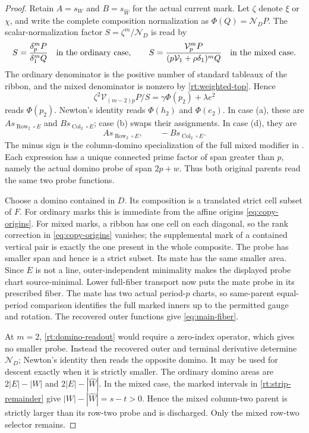 \documentclass[11pt,a4paper]{amsart}
\numberwithin{equation}{section}
\theoremstyle{plain}
\theoremstyle{definition}
\newcommand{\Row}{\operatorname{Row}}
\newcommand{\Col}{\operatorname{Col}}
\newcommand{\Vop}{\mathcal V}
\begin{document}
\begin{proof}
Retain \(A=s_W\) and \(B=s_{\widehat W}\) for the actual current mark.
Let \(\zeta\) denote \(\xi\) or \(\chi\), and write the complete composition
normalization as \(\Phi(Q)=\mathcal N_D P\).
The scalar-normalization factor \(S=\zeta^m/\mathcal N_D\) is read by
\[
 S=\frac{\delta_p^m P}{\delta_1^m Q}\quad\hbox{in the ordinary case},
 \qquad
 S=\frac{\Vop_p^m P}{(p\Vop_1+\rho\delta_1)^m Q}
       \quad\hbox{in the mixed case}.
\]
The ordinary denominator is the positive number of standard tableaux
of the ribbon, and the mixed denominator is nonzero by
\eqref{rt:weighted-top}.  Hence
\begin{equation}\label{rt:domino-readout}
 \zeta^2\Vop_{(m-2)p}P/S=\gamma\Phi(p_2)+\lambda e^2
\end{equation}
reads \(\Phi(p_2)\).  Newton's identity reads \(\Phi(h_2)\) and \(\Phi(e_2)\).  In case (a), these are \(A s_{\Row_2\circ E}\) and \(B s_{\Col_2\circ E}\); case (b) swaps their assignments.  In case (d), they are
\[
 A s_{\Row_2\circ E},\qquad -B s_{\Col_2\circ E}.
\]
The minus sign is the column-domino specialization of the full mixed modifier in \cite[Mixed weighted covariance]{Shields2026Readout}.  Each expression has a unique connected prime factor of span greater than \(p\), namely the actual domino probe of span \(2p+w\).  Thus both original parents read the same two probe functions.

Choose a domino contained in \(D\).  Its composition is a translated strict cell subset of \(F\).  For ordinary marks this is immediate from the affine origins \eqref{eq:copy-origins}.  For mixed marks, a ribbon has one cell on each diagonal, so the rank correction in \eqref{eq:copy-origins} vanishes; the supplemental mark of a contained vertical pair is exactly the one present in the whole composite.  The probe has smaller span and hence is a strict subset.  Its mate has the same smaller area.  Since \(E\) is not a line, outer-independent minimality makes the displayed probe chart source-minimal.  Lower full-fiber transport now puts the mate probe in its prescribed fiber.  The mate has two actual period-\(p\) charts, so same-parent equal-period comparison identifies the full marked inners up to the permitted gauge and rotation.  The recovered outer functions give \eqref{eq:main-fiber}.

At \(m=2\), \eqref{rt:domino-readout} would require a zero-index operator, which gives no smaller probe.  Instead the recovered outer and terminal derivative determine \(\mathcal N_D\); Newton's identity then reads the opposite domino.  It may be used for descent exactly when it is strictly smaller.  The ordinary domino areas are \(2|E|-|W|\) and \(2|E|-|\widehat W|\).  In the mixed case, the marked intervals in \eqref{rt:strip-remainder} give \(|W|-|\widehat W|=s-t>0\).  Hence the mixed column-two parent is strictly larger than its row-two probe and is discharged.  Only the mixed row-two selector remains.
\end{proof}
\end{document}
